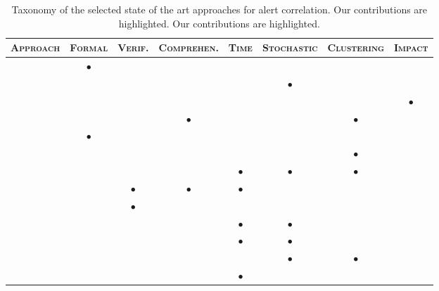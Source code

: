\begin{table}
  \renewcommand{\arraystretch}{1.5}
  \begin{tabular}{rccccccc}
    \toprule \textsc{Approach} & \textsc{Formal} & \textsc{Verif.} &
    \textsc{Comprehen.} & \textsc{Time} & \textsc{Stochastic} &
    \textsc{Clustering} & \textsc{Impact} \\

 \midrule
    \citep{herve-debar} & $\bullet$ & & & & & & \\

    \citep{valdes:raid2001:correlation} & & & & & $\bullet$ & & \\

    \citep{impactcorrelation} & & & & & & & $\bullet$ \\

    \citep{mirador} & & & $\bullet$ & & & $\bullet$ & \\

    \citep{morinmdd02} & $\bullet$ & & & & & & \\

    \citep{episodic_rule} & & & & & & $\bullet$ & \\

    \citep{dblp:conf/raid/qinl03} & & & & $\bullet$ & $\bullet$ &
    $\bullet$ & \\

    \citep{valeur04comprehensive} & & $\bullet$ &
    $\bullet$ & $\bullet$ & & & \\

    \citep{kruegel:dimva2004:verification} & & $\bullet$ & & & & & \\

    \citep{me-alert} & & & & $\bullet$ & $\bullet$ & & \\

    \textbf{\citep{MaggiZaneroRAID07}} & & & & $\bullet$ & $\bullet$ &
    & \\

    \citep{martinez:acsac2008:clustering} & & & & & $\bullet$ &
    $\bullet$ & \\

    \textbf{\citep{2009_maggi_zanero_matteucci_fusion}}&& & &
    $\bullet$ & & & \\

 \bottomrule
\end{tabular}

\caption{Taxonomy of the selected state of the art approaches for
  alert correlation. Our contributions are highlighted. Our
  contributions are highlighted.}

\label{tab:correlation-sota-taxonomy}
\end{table}

